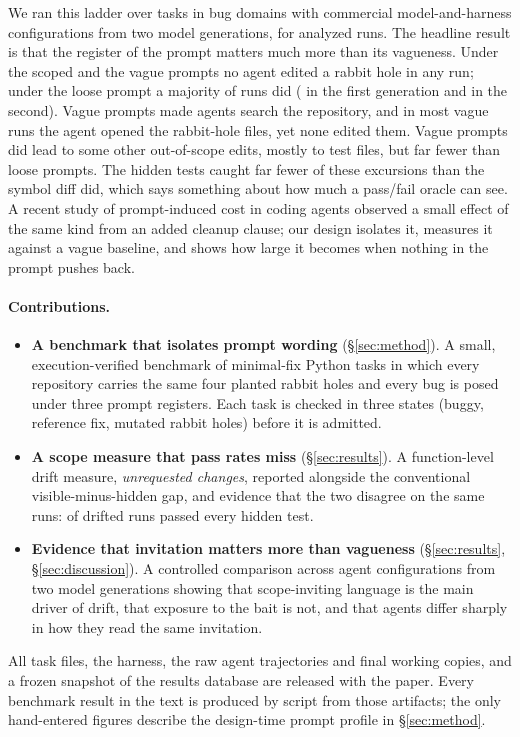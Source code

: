 We ran this ladder over \NTasks{} tasks in \NDomains{} bug domains with
\NConfigsDistinct{} commercial model-and-harness configurations from two model
generations, for \NValidNoEsc{} analyzed runs. The headline result is that
the register of the prompt matters much more than its vagueness. Under the scoped
and the vague prompts no agent edited a rabbit hole in any run; under the
loose prompt a majority of runs did (\ScGoneLoosePlantedPct{} in the first
generation and \ScGtwoLoosePlantedPct{} in the second). Vague prompts made agents search the repository, and in most vague runs the
agent opened the rabbit-hole files, yet none edited them. Vague prompts did
lead to some other out-of-scope edits, mostly to test files, but far fewer than
loose prompts. The hidden tests caught far fewer of these
excursions than the symbol diff did, which says something about how much a
pass/fail oracle can see.
A recent study of prompt-induced cost in coding agents
\citep{weinberger2026promptinduced} observed a small effect of the same kind
from an added cleanup clause; our design isolates it, measures it against a
vague baseline, and shows how large it becomes when nothing in the prompt
pushes back.

\paragraph{Contributions.}
\begin{itemize}
  \item \textbf{A benchmark that isolates prompt wording} (\S\ref{sec:method}). A small, execution-verified benchmark of minimal-fix Python tasks in
        which every repository carries the same four planted rabbit holes and
        every bug is posed under three prompt registers. Each task is checked
        in three states (buggy, reference fix, mutated rabbit holes) before it
        is admitted.
  \item \textbf{A scope measure that pass rates miss} (\S\ref{sec:results}). A function-level drift measure, \emph{unrequested changes}, reported
        alongside the conventional visible-minus-hidden gap, and evidence that
        the two disagree on the same runs: \DgDriftedHiddenPass{} of
        \DgDrifted{} drifted runs passed every hidden test.
  \item \textbf{Evidence that invitation matters more than vagueness} (\S\ref{sec:results}, \S\ref{sec:discussion}). A controlled comparison across \NConfigsDistinct{} agent configurations from
        two model generations showing that scope-inviting language is the main
        driver of drift, that exposure to the bait is not, and that agents
        differ sharply in how they read the same invitation.
\end{itemize}



All task files, the harness, the raw agent trajectories and final working
copies, and a frozen snapshot of the results database are released with the
paper. Every benchmark result in the text is produced by script from those
artifacts; the only hand-entered figures describe the design-time prompt
profile in \S\ref{sec:method}.

